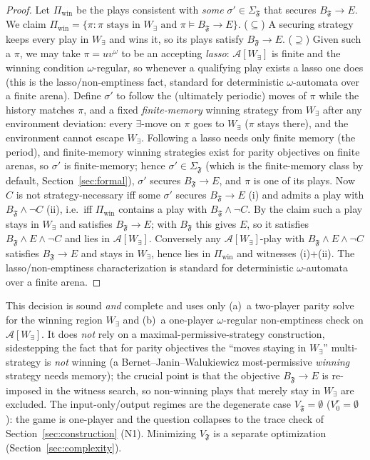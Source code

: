 \documentclass[11pt]{article}
\theoremstyle{remark}
\newcommand{\Frame}{\mathfrak{F}}
\begin{document}
\begin{proof}
Let \(\Pi_{\mathrm{win}}\) be the plays consistent with \emph{some}
\(\sigma'\in\Sigma_{\Frame}\) that secures \(B_{\Frame}\rightarrow E\). We claim
\(\Pi_{\mathrm{win}}=\{\pi:\pi\text{ stays in }W_\exists\text{ and }\pi\models
B_{\Frame}\rightarrow E\}\). (\(\subseteq\)) A securing strategy keeps every play
in \(W_\exists\) and wins it, so its plays satisfy \(B_{\Frame}\rightarrow E\).
(\(\supseteq\)) Given such a \(\pi\), we may take \(\pi=uv^\omega\) to be an
accepting \emph{lasso}: \(\mathcal{A}[W_\exists]\) is finite and the winning
condition \(\omega\)-regular, so whenever a qualifying play exists a lasso one
does (this is the lasso/non-emptiness fact, standard for deterministic
\(\omega\)-automata over a finite arena). Define \(\sigma'\) to follow the
(ultimately periodic) moves of \(\pi\) while the history matches \(\pi\), and a
fixed \emph{finite-memory} winning strategy from \(W_\exists\) after any
environment deviation: every \(\exists\)-move on \(\pi\) goes to \(W_\exists\)
(\(\pi\) stays there), and the environment cannot escape \(W_\exists\). Following a
lasso needs only finite memory (the period), and finite-memory winning strategies
exist for parity objectives on finite arenas, so \(\sigma'\) is finite-memory;
hence \(\sigma'\in\Sigma_{\Frame}\) (which is the finite-memory class by default,
Section~\ref{sec:formal}), \(\sigma'\) secures \(B_{\Frame}\rightarrow E\), and
\(\pi\) is one of its plays. Now \(C\) is not strategy-necessary iff some
\(\sigma'\) secures \(B_{\Frame}\rightarrow E\) (i) and admits a play with
\(B_{\Frame}\wedge\neg C\) (ii), i.e.\ iff \(\Pi_{\mathrm{win}}\) contains a play
with \(B_{\Frame}\wedge\neg C\). By the claim such a play stays in \(W_\exists\)
and satisfies \(B_{\Frame}\rightarrow E\); with \(B_{\Frame}\) this gives \(E\), so
it satisfies \(B_{\Frame}\wedge E\wedge\neg C\) and lies in
\(\mathcal{A}[W_\exists]\). Conversely any \(\mathcal{A}[W_\exists]\)-play with
\(B_{\Frame}\wedge E\wedge\neg C\) satisfies \(B_{\Frame}\rightarrow E\) and stays
in \(W_\exists\), hence lies in \(\Pi_{\mathrm{win}}\) and witnesses (i)+(ii). The
lasso/non-emptiness characterization is standard for deterministic
\(\omega\)-automata over a finite arena.
\end{proof}

This decision is sound \emph{and} complete and uses only (a)~a two-player parity
solve for the winning region \(W_\exists\) and (b)~a one-player
\(\omega\)-regular non-emptiness check on \(\mathcal{A}[W_\exists]\). It does
\emph{not} rely on a maximal-permissive-strategy construction, sidestepping the
fact that for parity objectives the ``moves staying in \(W_\exists\)''
multi-strategy is \emph{not} winning (a Bernet--Janin--Walukiewicz most-permissive
\emph{winning} strategy needs memory); the crucial point is that the objective
\(B_{\Frame}\rightarrow E\) is re-imposed in the witness search, so non-winning
plays that merely stay in \(W_\exists\) are excluded. The input-only/output
regimes are the degenerate case \(V_{\Frame}=\emptyset\) (\(V^r_0=\emptyset\)):
the game is one-player and the question collapses to the trace check of
Section~\ref{sec:construction} (N1). Minimizing \(V_{\Frame}\) is a separate
optimization (Section~\ref{sec:complexity}).
\end{document}
